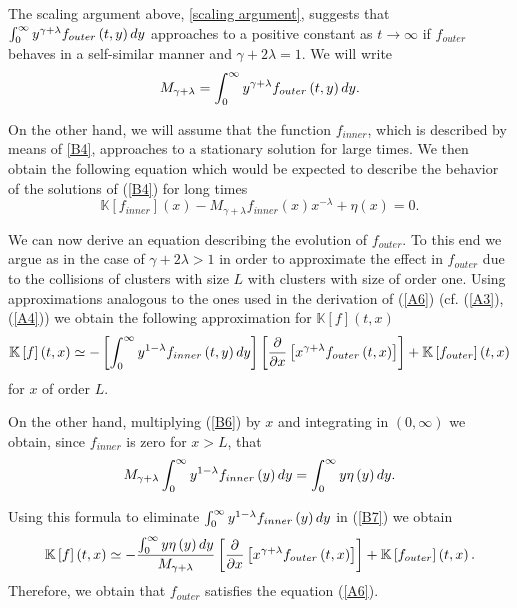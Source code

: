 \documentclass[11pt]{article}
\numberwithin{equation}{section}
\theoremstyle{plain}
\newcommand{\der}{\textup{d}}
\begin{document}
The scaling argument above, \eqref{scaling argument}, suggests that $\int_{0}^{\infty}y^{\gamma+\lambda
}f_{outer}\left(  t,y\right) \der y$ approaches to a positive constant as
$t\rightarrow\infty$ if $f_{outer}$ behaves in a self-similar manner and
$\gamma+2\lambda=1.$ We will write%
\begin{equation}
M_{\gamma+\lambda}=\int_{0}^{\infty}y^{\gamma+\lambda}f_{outer}\left(
t,y\right)  \der y. \label{B5}%
\end{equation}

On the other hand, we will assume that the function $f_{inner}$, which is
described by means of \eqref{B4}, approaches to a stationary solution for large
times. We then obtain the following equation which would be expected to
describe the behavior of the solutions of (\ref{B4}) for long times%
\begin{equation}
\mathbb{K}\left[  f_{inner}\right]  \left(  x\right)  -M_{\gamma+\lambda
}f_{inner}\left(  x\right)  x^{-\lambda}+\eta\left(  x\right)  =0.\label{B6}%
\end{equation}

We can now derive an equation describing the
evolution of $f_{outer}.$ To this end we argue as in the case of
$\gamma+2\lambda>1$ in order to approximate the effect in $f_{outer}$ due to
the collisions of clusters with size $L$ with clusters with size of order
one. Using approximations analogous to the ones used in the derivation of
(\ref{A6}) (cf. (\ref{A3}), (\ref{A4})) we obtain the following approximation
for $\mathbb{K}\left[  f\right]  \left(  t,x\right)  $
\begin{equation}
\mathbb{K}\left[  f\right]  \left(  t,x\right)  \simeq-\left[  \int
_{0}^{\infty}y^{1-\lambda}f_{inner}\left(  t,y\right)  \der y\right]  \left[
\frac{\partial}{\partial x}\left[  x^{\gamma+\lambda}f_{outer}\left(
t,x\right)  \right]  \right]  +\mathbb{K}\left[  f_{outer}\right]  \left(
t,x\right)  \label{B7}%
\end{equation}
for $x$ of order $L.$

On the other hand, multiplying (\ref{B6}) by $x$ and integrating in $\left(
0,\infty\right)  $ we obtain, since $f_{inner}$ is zero for $x>L$, that%
\[
M_{\gamma+\lambda}\int_{0}^{\infty}y^{1-\lambda}f_{inner}\left(  y\right)
\der y=\int_{0}^{\infty}y\eta\left(  y\right)  \der y.
\]


Using this formula to eliminate $\int_{0}^{\infty}y^{1-\lambda}f_{inner}%
\left(  y\right)  \der y$ in (\ref{B7}) we obtain%
\[
\mathbb{K}\left[  f\right]  \left(  t,x\right)  \simeq-\frac{\int_{0}^{\infty
}y\eta\left(  y\right) \der y}{M_{\gamma+\lambda}}\left[  \frac{\partial
}{\partial x}\left[  x^{\gamma+\lambda}f_{outer}\left(  t,x\right)  \right]
\right]  +\mathbb{K}\left[  f_{outer}\right]  \left(  t,x\right). 
\]
Therefore, we obtain that $f_{outer}$ satisfies the equation (\ref{A6}).
\end{document}
